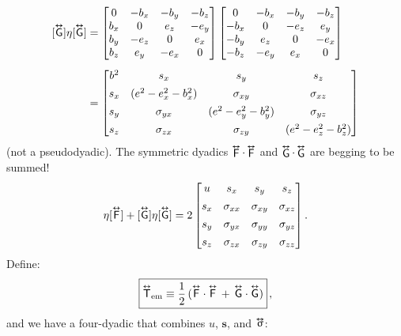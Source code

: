 \documentclass[12pt]{article}
\renewcommand{\vv}[1]{\mathbf{#1}}
\newcommand{\tightoverset}[2]{%
  \mathop{#2}\limits^{\vbox to -.5ex{\kern-0.75ex\hbox{$#1$}\vss}}}
\newcommand{\inlinedy}[1]{\tightoverset{\text{\tiny$\bm\leftrightarrow$}}{#1}}
\newcommand{\capdy}[1]{ \overset{ \text{\tiny$\bm\leftrightarrow$} }{\vphantom{\text{\small{A}}}\smash{#1}} }
\begin{document}
\begin{equation*}
\begin{aligned}
\mkern0mu [\capdy{\mathsf{G}}] \eta [\capdy{\mathsf{G}}]
&=
\begin{bmatrix}
0 & -b_x & -b_y & -b_z \\
b_x & 0 & e_z & -e_y \\
b_y & -e_z & 0 & e_x \\
b_z & e_y & -e_x & 0
\end{bmatrix}
\begin{bmatrix}
0 & -b_x & -b_y & -b_z \\
-b_x & 0 & -e_z & e_y \\
-b_y & e_z & 0 & -e_x \\
-b_z & -e_y & e_x & 0
\end{bmatrix} \\[5pt]
&=
\begin{bmatrix}
b^2 & s_x & s_y & s_z \\[1ex]
s_x & (e^2 - e_x^2 - b_x^2) & \sigma_{x y} & \sigma_{x z} \\[1ex]
s_y & \sigma_{y x} & (e^2 - e_y^2 - b_y^2)  & \sigma_{y z} \\[1ex]
s_z & \sigma_{z x} & \sigma_{z y} & (e^2 - e_z^2 - b_z^2) 
\end{bmatrix}
\end{aligned}
\end{equation*}
(not a pseudodyadic). The symmetric dyadics $\inlinedy{\mathsf{F}} \cdot \inlinedy{\mathsf{F}}$ and $\inlinedy{\mathsf{G}} \cdot \inlinedy{\mathsf{G}}$ are begging to be summed!
\begin{equation*}
[\capdy{\mathsf{F}}] \eta [\capdy{\mathsf{F}}] + [\capdy{\mathsf{G}}] \eta [\capdy{\mathsf{G}}]
= 2
\begin{bmatrix}
 u &  s_x &  s_y &  s_z \\[1ex]
 s_x &  \sigma_{x x} &  \sigma_{x y} &  \sigma_{x z} \\[1ex]
 s_y &  \sigma_{y x} &  \sigma_{yy}  &  \sigma_{y z} \\[1ex]
 s_z &  \sigma_{z x} &  \sigma_{z y} &  \sigma_{zz}
\end{bmatrix}.
\end{equation*}
Define:
\begin{equation}\label{eq:eset}
\boxed { \capdy{\mathsf{T}}_{\textrm{em}} \equiv \dfrac{1}{2} \, ( \capdy{\mathsf{F}} \cdot \capdy{\mathsf{F}} \, + \, \capdy{\mathsf{G}} \cdot \capdy{\mathsf{G}} ) } \, ,
\end{equation}
and we have a four-dyadic that combines $u$, $\vv s$, and $\inlinedy{\upsigma}$:
\end{document}

